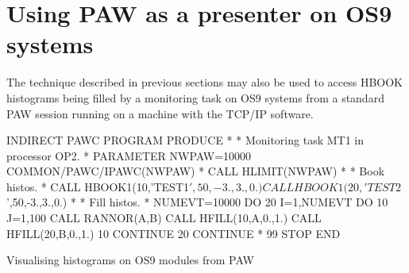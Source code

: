 \newpage

\section{Using PAW as a presenter on OS9 systems}
\label{sec:pawos9}
 
The technique described in previous sections may also be used
to access HBOOK histograms being filled by a monitoring task
on OS9 systems from a standard PAW session running
on a machine with the TCP/IP software.
 
\begin{minipage}{.48\textwidth}
\begin{XMP}
      INDIRECT PAWC
      PROGRAM PRODUCE
*
*        Monitoring task MT1 in processor OP2.
*
      PARAMETER NWPAW=10000
      COMMON/PAWC/IPAWC(NWPAW)
*
      CALL HLIMIT(NWPAW)
*
*       Book histos.
*
      CALL HBOOK1(10,'TEST1$',50,-3.,3.,0.)
      CALL HBOOK1(20,'TEST2$',50,-3.,3.,0.)
*
*       Fill histos.
*
      NUMEVT=10000
      DO 20 I=1,NUMEVT
         DO 10 J=1,100
            CALL RANNOR(A,B)
            CALL HFILL(10,A,0.,1.)
            CALL HFILL(20,B,0.,1.)
 10      CONTINUE
 20   CONTINUE
*
 99   STOP
      END
\end{XMP}
\end{minipage}\hfill
\begin{minipage}{.50\textwidth}
\begin{Fighere}
\caption{Visualising histograms on OS9 modules from PAW}
\end{Fighere}
\end{minipage}
\bigskip
 
